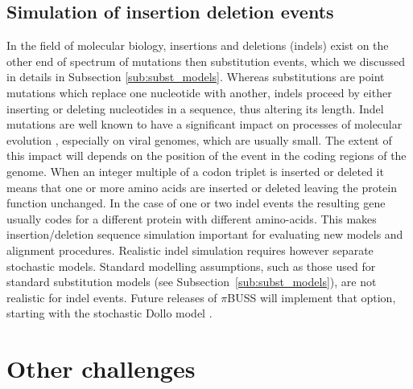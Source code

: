 \subsection{Simulation of insertion deletion events}

In the field of molecular biology, insertions and deletions (indels) exist on the other end of spectrum of mutations then substitution events, which we discussed in details in Subsection \ref{sub:subst_models}.
Whereas substitutions are point mutations which replace one nucleotide with another, indels proceed by either inserting or deleting nucleotides in a sequence, thus altering its length. 
Indel mutations are well known to have a significant impact on processes of molecular evolution \citep{Fletcher2009}, especially on viral genomes, which are usually small.
The extent of this impact will depends on the position of the event in the coding regions of the genome.
When an integer multiple of a codon triplet is inserted or deleted it means that one or more amino acids are inserted or deleted leaving the protein function unchanged.
In the case of one or two indel events the resulting gene usually codes for a different protein with different amino-acids.
This makes insertion/deletion sequence simulation important for evaluating new models and alignment procedures.
Realistic indel simulation requires however separate stochastic models.
Standard modelling assumptions, such as those used for standard substitution models (see Subsection~\ref{sub:subst_models}), are not realistic for indel events.
Future releases of $\pi$BUSS will implement that option, starting with the stochastic Dollo model \citep{LeQuesne1974}.

\section{Other challenges}

